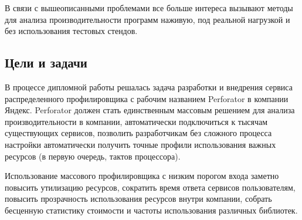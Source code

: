 В связи с вышеописанными проблемами все больше интереса вызывают методы для анализа производительности программ наживую, под реальной нагрузкой и без использования тестовых стендов.

\subsection{Цели и задачи}
В процессе дипломной работы решалась задача разработки и внедрения сервиса распределенного профилировщика с рабочим названием Perforator в компании Яндекс.
Perforator должен стать единственным массовым решением для анализа производительности в компании, автоматически подключиться к тысячам существующих сервисов, позволить разработчикам без сложного процесса настройки автоматически получить точные профили использования важных ресурсов (в первую очередь, тактов процессора).

Использование массового профилировщика с низким порогом входа заметно повысить утилизацию ресурсов, сократить время ответа сервисов пользователям, повысить прозрачность использования ресурсов внутри компании, собрать бесценную статистику стоимости и частоты использования различных библиотек.
